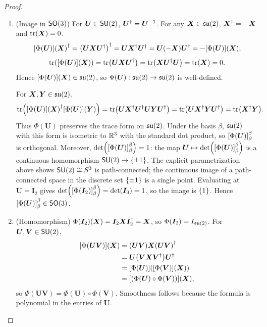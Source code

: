 \documentclass[11pt,reqno]{amsart}
\begin{document}
\begin{proof}
\begin{enumerate}
\item (Image in $\operatorname{\mathsf{SO}}(3)$)
For $\bm U\in\operatorname{\mathsf{SU}}(2)$, $\bm U^{\dagger}=\bm U^{-1}$.
For any $\bm X\in\mathfrak{su}(2)$, $\bm X^{\dagger}=-\bm X$ and $\tr\Br{\bm X}=0$.
\[
\FUNC{\Phi(\bm U)}{\bm X}\herm
=\Br{\bm U\bm X\bm U\herm}\herm
=\bm U\bm X\herm\bm U\herm
=\bm U(-\bm X)\bm U\herm
=-\FUNC{\Phi(\bm U)}{\bm X},
\]
\[
\tr\Br{\FUNC{\Phi(\bm U)}{\bm X}}
=\tr\Br{\bm U\bm X\bm U\herm}
=\tr\Br{\bm X\bm U\herm\bm U}
=\tr\Br{\bm X}=0.
\]
Hence $\FUNC{\Phi(\bm U)}{\bm X}\in\su(2)$, so
$\Phi(\bm U):\mathfrak{su}(2)\to\mathfrak{su}(2)$ is well-defined.

For $\bm X,\bm Y\in\mathfrak{su}(2)$,
\[
\tr\Br{\FUNC{\Phi(\bm U)}{\bm X}\herm\FUNC{\Phi(\bm U)}{\bm Y}}
=\tr\Br{\bm U\bm X\herm\bm U\herm\bm U\bm Y\bm U\herm}
=\tr\Br{\bm U\bm X\herm\bm Y\bm U\herm}
=\tr\Br{\bm X\herm\bm Y}.
\]
Thus $\Phi(\bm U)$ preserves the trace form on $\mathfrak{su}(2)$.  Under the basis
$\beta$, $\mathfrak{su}(2)$ with this form is isometric to $\mathbb{R}^3$ with the standard
dot product, so $\SqBr{\Phi(\bm U)}_\beta^\beta$ is orthogonal.  Moreover,
$\det\Br{\SqBr{\Phi(\bm U)}_\beta^\beta}=1$:
the map $\bm U\mapsto\det\Br{\SqBr{\Phi(\bm U)}_\beta^\beta}$ is a continuous
homomorphism $\SU(2)\to\set{\pm1}$.  The explicit parametrization above shows
$\operatorname{\mathsf{SU}}(2)\cong S^3$ is path-connected; the continuous image of a path-connected
space in the discrete set $\set{\pm1}$ is a single point.  Evaluating at
$\bm U=\bm I_2$ gives $\det\Br{\SqBr{\Phi(\bm I_2)}_\beta^\beta}=\det\Br{\bm I_3}=1$,
so the image is $\set{1}$.
Hence $\SqBr{\Phi(\bm U)}_\beta^\beta\in\SO(3)$.

\item (Homomorphism)
$\Phi(\bm I_2)(\bm X)=\bm I_2\bm X\bm I_2^{\dagger}=\bm X$, so
$\Phi(\bm I_2)=I_{\mathfrak{su}(2)}$.
For $\bm U,\bm V\in\operatorname{\mathsf{SU}}(2)$,
\[\begin{aligned}
\FUNC{\Phi(\bm U\bm V)}{\bm X}
&=\Br{\bm U\bm V}\bm X\Br{\bm U\bm V}\herm\\
&=\bm U\Br{\bm V\bm X\bm V\herm}\bm U\herm\\
&=\FUNC{\Phi(\bm U)}{\FUNC{\Phi(\bm V)}{\bm X}}\\
&=\FUNC{(\Phi(\bm U)\circ\Phi(\bm V))}{\bm X},\\
\end{aligned}\]
so $\Phi(\bm U\bm V)=\Phi(\bm U)\circ\Phi(\bm V)$.  Smoothness follows
because the formula is polynomial in the entries of $\bm U$.


\end{enumerate}
\end{proof}
\end{document}
